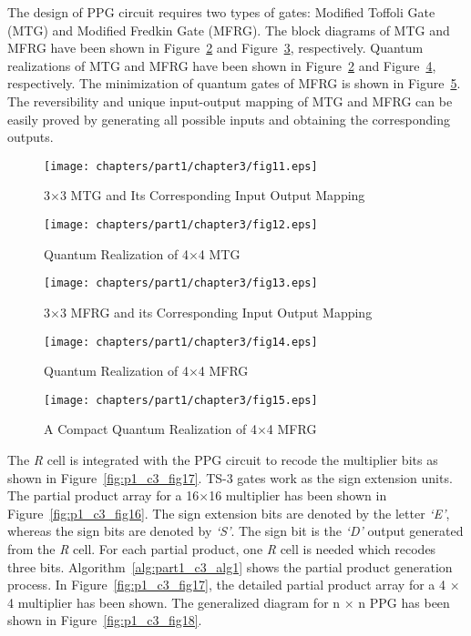 The design of PPG circuit requires two types of gates: Modified Toffoli Gate (MTG) and Modified Fredkin Gate (MFRG). The block diagrams of MTG and MFRG have been shown in Figure~\ref{fig:p1_c3_fig12} and Figure~\ref{fig:p1_c3_fig13}, respectively. Quantum realizations of MTG and MFRG have been shown in Figure~\ref{fig:p1_c3_fig12} and Figure~\ref{fig:p1_c3_fig14}, respectively. The minimization of quantum gates of MFRG is shown in Figure~\ref{fig:p1_c3_fig15}. The reversibility and unique input-output mapping of MTG and MFRG can be easily proved by generating all possible inputs and obtaining the corresponding outputs.

\begin{figure}[!tbh]
	\centering
	\texttt{[image: chapters/part1/chapter3/fig11.eps]}
	\caption{{3$\times $3} MTG and Its Corresponding Input Output Mapping}
	\label{fig:p1_c3_fig11}
\end{figure}

\begin{figure}[!tbh]
	\centering
	\texttt{[image: chapters/part1/chapter3/fig12.eps]}
	\caption{Quantum Realization of {4$\times $4} MTG}
	\label{fig:p1_c3_fig12}
\end{figure}

\begin{figure}[!tbh]
	\centering
	\texttt{[image: chapters/part1/chapter3/fig13.eps]}
	\caption{{3$\times $3} MFRG and its Corresponding Input Output Mapping}
	\label{fig:p1_c3_fig13}
\end{figure}

\begin{figure}[!tbh]
	\centering
	\texttt{[image: chapters/part1/chapter3/fig14.eps]}
	\caption{Quantum Realization of {4$\times $4} MFRG}
	\label{fig:p1_c3_fig14}
\end{figure}

\begin{figure}[!tbh]
	\centering
	\texttt{[image: chapters/part1/chapter3/fig15.eps]}
	\caption{A Compact Quantum Realization of {4$\times $4} MFRG}
	\label{fig:p1_c3_fig15}
\end{figure}
The \textit{R} cell is integrated with the PPG circuit to recode the multiplier bits as shown in Figure~\ref{fig:p1_c3_fig17}. TS-3 gates work as the sign extension units. The partial product array for a {16$\times $16} multiplier has been shown in Figure~\ref{fig:p1_c3_fig16}. The sign extension bits are denoted by the letter \textit{`E'}, whereas the sign bits are denoted by \textit{`S'}. The sign bit is the \textit{`D'} output generated from the \textit{R} cell. For each partial product, one \textit{R }cell is needed which recodes three bits. Algorithm~\ref{alg:part1_c3_alg1} shows the partial product generation process. In Figure~\ref{fig:p1_c3_fig17}, the detailed partial product array for a {4 $\times$ 4} multiplier has been shown. The generalized diagram for {n $\times$ n} PPG has been shown in Figure~\ref{fig:p1_c3_fig18}.

